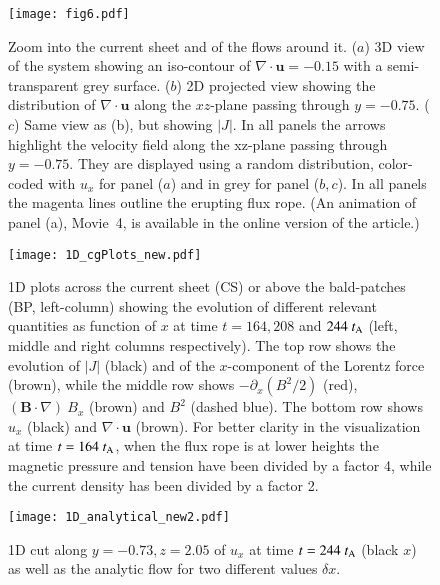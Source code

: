 \documentclass[apj]{emulateapj}
\newcommand{\tA}{t_{\rm A}}
\begin{document}
\begin{figure}
\begin{center}
\texttt{[image: fig6.pdf]}
%
\caption{Zoom into the current sheet and of the flows around it. 
($a$) 3D view of the system showing an iso-contour of $\nabla \cdot \mathbf{u} = -0.15$ with a semi-transparent grey surface. ($b$) 2D projected view showing the distribution of $\nabla \cdot \mathbf{u}$ along the $xz$-plane passing through $y=-0.75$.  ($c$) Same view as (b), but showing $|J|$.
In all panels the arrows highlight the velocity field along the xz-plane passing through $y=-0.75$. They are displayed using a random distribution, color-coded with $u_x$ for panel ($a$) and in grey for panel ($b,c$).
In all panels the magenta lines outline the erupting flux rope.
 (An animation of panel (a), Movie~4, is available in the online version of the article.) 
 }
\label{Fig:Div_u_3D}
\end{center}
\end{figure}
%

\begin{figure*}
\begin{center}
\texttt{[image: 1D\_cgPlots\_new.pdf]}
\caption{1D plots across the current sheet (CS) or above the bald-patches (BP, left-column) showing the evolution of different relevant quantities as function of $x$ at time $t=164, 208$ and $244~\tA$ (left, middle and right columns respectively). The top row shows the evolution of $|J|$ (black) and of the $x$-component of the Lorentz force (brown), while the middle row shows $- \partial_x (B^2/2)$ (red), $(\mathbf{B} \cdot \nabla)~B_x $ (brown) and $B^2$ (dashed blue). The bottom row shows $u_x$ (black) and  $\nabla \cdot \mathbf{u}$ (brown). For better clarity in the visualization at time $t=164~\tA$, when the flux rope is at lower heights the magnetic pressure and tension have been divided by a factor 4, while the current density has been divided by a factor 2.}
\label{Fig:1D-Rot_u}
\end{center}
\end{figure*}
\begin{figure}
\begin{center}
\texttt{[image: 1D\_analytical\_new2.pdf]}
\caption{1D cut along $y=-0.73, z=2.05$ of $u_x$ at time $t=244~\tA$ (black $x$) as well as the analytic flow for two different values $\delta x$. }
\label{Fig:1D_analyt}
\end{center}
\end{figure}
\end{document}
